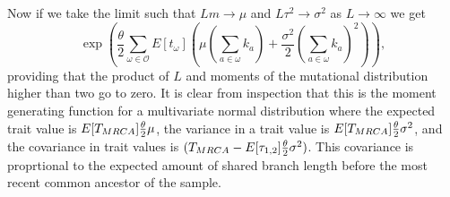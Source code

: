 Now if we take the limit such that $Lm \to \mu$ and $L\tau^2\to \sigma^2$ as $L
\to \infty$ we get
\begin{equation}
  \exp \left( \frac{\theta}{2} \sum_{\omega \in \mathcal{O}}E[t_{\omega}] \left( \mu \left(
  \sum_{a \in \omega} k_a\right) + \frac{\sigma^2}{2}\left( \sum_{a \in \omega}
  k_a\right)^2\right)\right),
\end{equation}
providing that the product of $L$ and moments of the mutational distribution
higher than two go to zero. It is clear from inspection that this is the moment
generating function for a multivariate normal distribution where the expected
trait value is $E[T_{MRCA}]\frac{\theta}{2} \mu$, the variance in a trait value is
$E[T_{MRCA}]\frac{\theta}{2} \sigma^2$, and the covariance in trait values is
$(T_{MRCA}-E[\tau_{1,2}]\frac{\theta}{2} \sigma^2)$. This covariance is proprtional to the
expected amount of shared branch length before the most recent common ancestor
of the sample.
